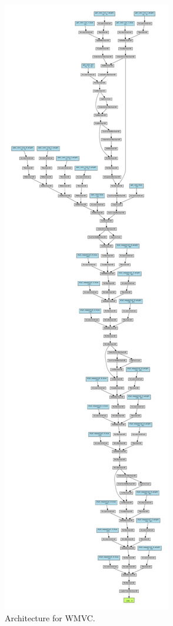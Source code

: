 \documentclass{article}
\begin{document}
\begin{figure}
     \centering
     \includegraphics[height=0.7\paperheight]{figures/wmvc_arch}
     \caption{Architecture for WMVC.}
     \label{fig:wmvc_arch}
\end{figure}
\end{document}
